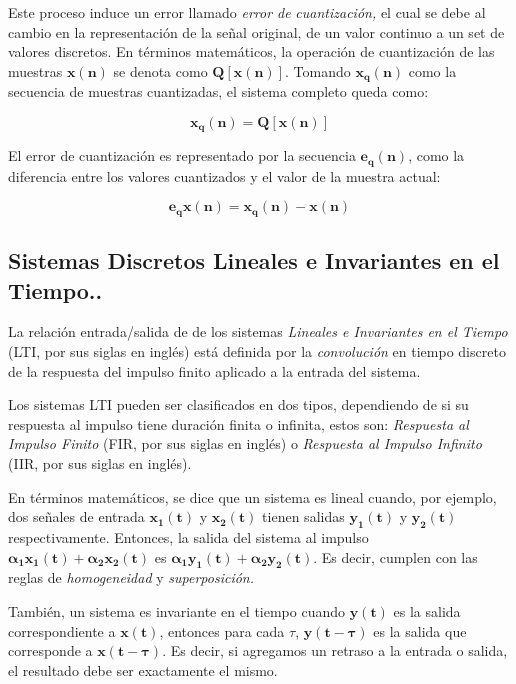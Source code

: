 Este proceso induce un error llamado \emph{error de} \emph{cuantizaci\'{o}n,
}el cual se debe al cambio en la representaci\'{o}n de la se\~{n}al
original, de un valor continuo a un set de valores discretos. En t\'{e}rminos
matem\'{a}ticos, la operaci\'{o}n de cuantizaci\'{o}n de las muestras
$\mathit{\mathbf{x(n)}}$ se denota como $\mathbf{Q[x(n)]}$. Tomando
$\mathbf{x_{q}(n)}$ como la secuencia de muestras cuantizadas, el
sistema completo queda como:

\begin{equation}
\mathbf{x_{q}(n)}\mathbf{=Q[x(n)]}
\end{equation}

El error de cuantizaci\'{o}n es representado por la secuencia $\mathbf{e_{q}(n)}$,
como la diferencia entre los valores cuantizados y el valor de la
muestra actual:

\begin{equation}
\mathbf{e_{q}x(n)=x_{q}(n)-x(n)}
\end{equation}


\subsection{Sistemas Discretos Lineales e Invariantes en el Tiempo..}

La relaci\'{o}n entrada/salida de de los sistemas \emph{Lineales e
Invariantes en el Tiempo} (LTI, por sus siglas en ingl\'{e}s) est\'{a}
definida por la \emph{convoluci\'{o}n }en tiempo discreto de la respuesta
del impulso finito aplicado a la entrada del sistema.

Los sistemas LTI pueden ser clasificados en dos tipos, dependiendo
de si su respuesta al impulso tiene duraci\'{o}n finita o infinita,
estos son:\emph{ Respuesta al Impulso Finito} (FIR, por sus siglas
en ingl\'{e}s) o \emph{Respuesta al Impulso Infinito} (IIR, por sus
siglas en ingl\'{e}s).

En t\'{e}rminos matem\'{a}ticos, se dice que un sistema es lineal
cuando, por ejemplo, dos se\~{n}ales de entrada $\mathbf{x_{1}(t)}$
y $\mathbf{x_{2}(t)}$ tienen salidas $\mathbf{y_{1}(t)}$ y $\mathbf{y_{2}(t)}$
respectivamente. Entonces, la salida del sistema al impulso $\mathbf{\alpha_{1}x_{1}(t)+\alpha_{2}x_{2}(t)}$
es $\mathbf{\alpha_{1}y_{1}(t)+\alpha_{2}y_{2}(t)}$. Es decir, cumplen
con las reglas de \emph{homogeneidad }y \emph{superposici\'{o}n.}

Tambi\'{e}n, un sistema es invariante en el tiempo cuando $\mathbf{y(t)}$
es la salida correspondiente a $\mathbf{x(t)}$, entonces para cada
\textbf{\ensuremath{\tau}}, $\mathrm{\mathbf{y(t-\tau)}}$ es la salida
que corresponde a $\mathbf{x(t-\tau)}$. Es decir, si agregamos un
retraso a la entrada o salida, el resultado debe ser exactamente el
mismo.

